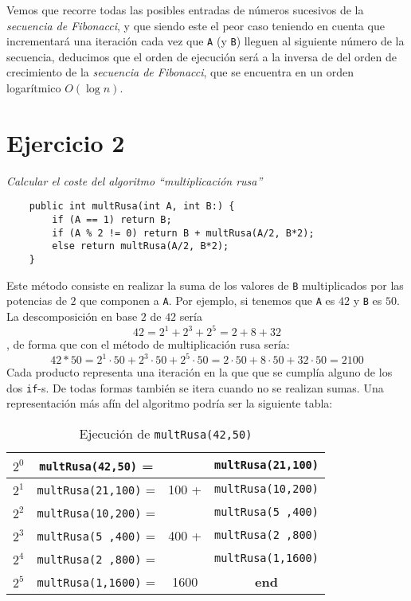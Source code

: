 \documentclass[a4paper, 12pt]{article}
\begin{document}
        Vemos que recorre todas las posibles entradas de números sucesivos de la 
        \textit{secuencia de Fibonacci}, y que siendo este el peor caso teniendo 
        en cuenta que incrementará una iteración cada vez que \texttt{A} (y 
        \texttt{B}) lleguen al siguiente número de la secuencia, deducimos que 
        el orden de ejecución será a la inversa de del orden de crecimiento de 
        la \textit{secuencia de Fibonacci}, que se encuentra en un orden 
        logarítmico $O(\log n)$.

    \section{Ejercicio 2}

        \textit{Calcular el coste del algoritmo ``multiplicación rusa''}

        \begin{verbatim}
    public int multRusa(int A, int B:) {
        if (A == 1) return B;
        if (A % 2 != 0) return B + multRusa(A/2, B*2);
        else return multRusa(A/2, B*2);
    }
        \end{verbatim}

        Este método consiste en realizar la suma de los valores de \texttt{B} 
        multiplicados por las potencias de $2$ que componen a \texttt{A}. Por 
        ejemplo, si tenemos que \texttt{A} es $42$ y \texttt{B} es $50$. La 
        descomposición en base $2$ de $42$ sería
        \[
            42 = 2^1 + 2^3 + 2^5 = 2 + 8 + 32  
        \]
        , de forma que con el método de multiplicación rusa sería:
        \[
            42 * 50 = 2^1 \cdot 50 + 2^3 \cdot 50 + 2^5 \cdot 50  
                    = 2 \cdot 50 + 8 \cdot 50 + 32 \cdot 50 = 2100          
        \]
        Cada producto representa una iteración en la que que se cumplía alguno 
        de los dos \texttt{if}-s. De todas formas también se itera cuando no se 
        realizan sumas. Una representación más afín del algoritmo podría ser la 
        siguiente tabla: 
        
        \begin{table}[ht!]
            \centering
            \begin{tabular}{|c|c|c|c|}
                \hline
                $2^0$ & \texttt{multRusa(42,50)}  = &       & \texttt{multRusa(21,100)} \\\hline
                $2^1$ & \texttt{multRusa(21,100)} = & 100 + & \texttt{multRusa(10,200)} \\\hline
                $2^2$ & \texttt{multRusa(10,200)} = &       & \texttt{multRusa(5 ,400)} \\\hline
                $2^3$ & \texttt{multRusa(5 ,400)} = & 400 + & \texttt{multRusa(2 ,800)} \\\hline
                $2^4$ & \texttt{multRusa(2 ,800)} = &       & \texttt{multRusa(1,1600)} \\\hline
                $2^5$ & \texttt{multRusa(1,1600)} = & 1600  & \textbf{end}\\\hline 
            \end{tabular}
            \caption{Ejecución de \texttt{multRusa(42,50)}}
        \end{table}
\end{document}
